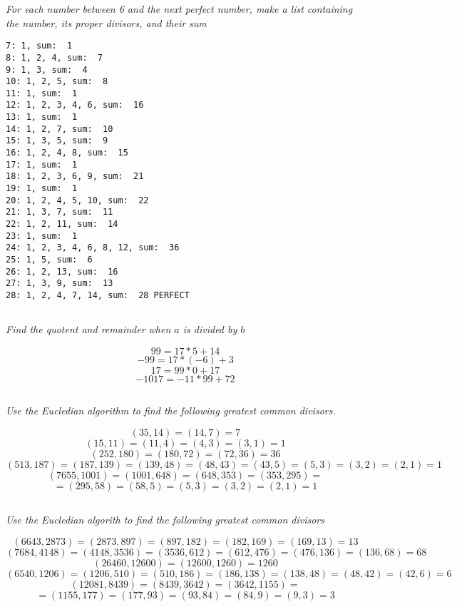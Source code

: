 \documentclass[11pt,oneside,titlepage]{book}
\begin{document}
\textit{For each number between 6 and the next perfect number, make a list containing the number,
its proper divisors, and their sum}

\begin{verbatim}
7: 1, sum:  1
8: 1, 2, 4, sum:  7
9: 1, 3, sum:  4
10: 1, 2, 5, sum:  8
11: 1, sum:  1
12: 1, 2, 3, 4, 6, sum:  16
13: 1, sum:  1
14: 1, 2, 7, sum:  10
15: 1, 3, 5, sum:  9
16: 1, 2, 4, 8, sum:  15
17: 1, sum:  1
18: 1, 2, 3, 6, 9, sum:  21
19: 1, sum:  1
20: 1, 2, 4, 5, 10, sum:  22
21: 1, 3, 7, sum:  11
22: 1, 2, 11, sum:  14
23: 1, sum:  1
24: 1, 2, 3, 4, 6, 8, 12, sum:  36
25: 1, 5, sum:  6
26: 1, 2, 13, sum:  16
27: 1, 3, 9, sum:  13
28: 1, 2, 4, 7, 14, sum:  28 PERFECT
\end{verbatim}

\subsection{}

\textit{Find the quotent and remainder when $a$ is divided by $b$}

$$99 = 17 * 5 + 14$$
$$-99 = 17 * (-6) + 3$$
$$17 = 99 * 0 + 17$$
$$-1017 = -11 * 99 + 72$$

\subsection{}

\textit{Use the Eucledian algorithm to find the following greatest common divisors.}

$$(35, 14) = (14, 7) = 7$$
$$(15, 11) = (11, 4) = (4, 3) = (3, 1) = 1$$
$$(252, 180) = (180, 72) = (72, 36) = 36$$
$$(513, 187) = (187, 139) = (139, 48) = (48, 43) = (43, 5) = (5, 3) = (3, 2) = (2, 1) = 1$$
$$(7655, 1001) = (1001, 648) = (648, 353) = (353, 295) = $$
$$ = (295, 58) = (58, 5) = (5, 3) = (3, 2) = (2, 1) = 1$$

\subsection{}

\textit{Use the Eucledian algorith to find the following greatest common divisors}

$$(6643, 2873) = (2873, 897) = (897, 182) = (182, 169) = (169, 13) = 13$$
$$(7684, 4148) = (4148, 3536) = (3536, 612) = (612, 476) = (476, 136) = (136, 68) = 68$$
$$(26460, 12600) = (12600, 1260) = 1260$$
$$(6540, 1206) = (1206, 510) = (510, 186) = (186, 138) = (138, 48) = (48, 42) = (42, 6) = 6$$
$$(12081, 8439) = (8439, 3642) = (3642, 1155) = $$
$$ = (1155, 177) = (177, 93) = (93, 84) = (84, 9) = (9, 3) = 3$$
\end{document}
